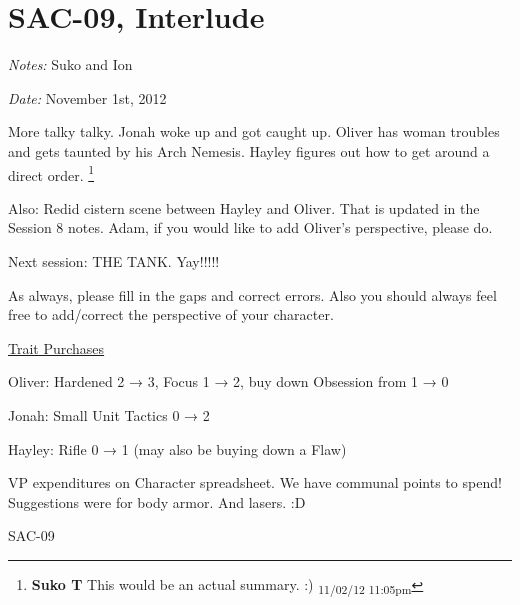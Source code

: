 \setcounter{chapter}{ 8 }
\chapter{\textbf{SAC-09, Interlude} }






\textit{Notes:} Suko and Ion

\textit{Date:} November 1st, 2012



More talky talky. Jonah woke up and got caught up. Oliver has woman troubles and gets taunted by his Arch Nemesis.  Hayley figures out how to get around a direct order. \footnote{\textbf{Suko T }This would be an actual summary. :) \textsubscript{11/02/12 11:05pm}}



Also: Redid cistern scene between Hayley and Oliver.  That is updated in the Session 8 notes.  Adam, if you would like to add Oliver's perspective, please do.



Next session: THE TANK.  Yay!!!!!



As always, please fill in the gaps and correct errors.  Also you should always feel free to add/correct the perspective of your character.



\noindent\hrulefill



\underline{  {\LARGE Trait Purchases }  }



Oliver: Hardened 2 → 3, Focus 1 → 2, buy down Obsession from 1 → 0

Jonah: Small Unit Tactics 0 → 2

Hayley: Rifle 0 → 1 (may also be buying down a Flaw)



VP expenditures on Character spreadsheet. We have communal points to spend!  Suggestions were for body armor. And lasers. :D

\noindent\hrulefill





 {\LARGE SAC-09 } 



